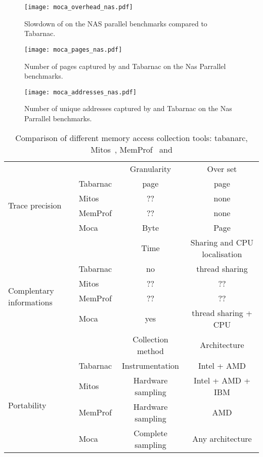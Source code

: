 \begin{figure}[htb]
    \centering
    \texttt{[image: moca\_overhead\_nas.pdf]}
    \caption{Slowdown of \Moca on the NAS parallel benchmarks compared to
    Tabarnac.}
    \label{fig:ovh}
\end{figure}

\begin{figure}[htb]
    \centering
    \texttt{[image: moca\_pages\_nas.pdf]}
    \caption{Number of pages captured by \Moca and Tabarnac on the Nas
    Parrallel benchmarks.}
    \label{fig:pages}
\end{figure}

\begin{figure}[htb]
    \centering
    \texttt{[image: moca\_addresses\_nas.pdf]}
    \caption{Number of unique addresses captured by \Moca and Tabarnac on the Nas
    Parrallel benchmarks.}
    \label{fig:addr}
\end{figure}

\begin{table}
    \centering
    \begin{tabular}{p{1.3cm}lcc}
        \toprule
        & & Granularity & Over set \\
        \cmidrule(lr){3-4}
        \multirow{4}{.8cm}{Trace precision}
        & Tabarnac & page & page \\
        & Mitos & ?? & none \\
        & MemProf & ?? & none \\
        & Moca & Byte & Page \\
        \midrule
        & & Time & Sharing and CPU localisation \\
        \cmidrule(lr){3-4}
        \multirow{4}{.8cm}{Complentary informations}
        & Tabarnac & no & thread sharing\\
        & Mitos & ?? & ?? \\
        & MemProf & ?? & ?? \\
        & Moca & yes & thread sharing + CPU \\
        \midrule
        & & Collection method & Architecture \\
        \cmidrule(lr){3-4}
        \multirow{4}{.8cm}{Portability}
        & Tabarnac & Instrumentation & Intel + AMD \\
        & Mitos & Hardware sampling & Intel + AMD + IBM \\
        & MemProf & Hardware sampling & AMD \\
        & Moca & Complete sampling & Any architecture\\
        \bottomrule
    \end{tabular}
    \caption{Comparison of different memory access collection
        tools: tabanarc\cite{Beniamine15TABARNACRR},
        Mitos~\cite{Gimenez14Dissecting},
        MemProf~\cite{Lachaize12MemProf} and \Moca}
        \label{tab:tools-comp}
\end{table}

